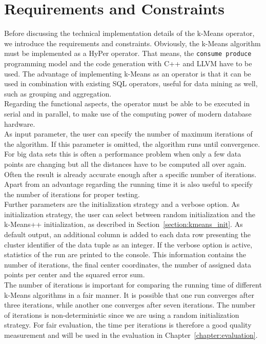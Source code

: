 \section{Requirements and Constraints}
Before discussing the technical implementation details of the k-Means operator, we introduce the requirements and constraints. Obviously, the k-Means algorithm must be implemented as a HyPer operator. That means, the \texttt{consume produce} programming model and the code generation with C++ and LLVM have to be used. The advantage of implementing k-Means as an operator is that it can be used in combination with existing SQL operators, useful for data mining as well, such as grouping and aggregation.
\\
Regarding the functional aspects, the operator must be able to be executed in serial and in parallel, to make use of the computing power of modern database hardware.
\\
As input parameter, the user can specify the number of maximum iterations of the algorithm. If this parameter is omitted, the algorithm runs until convergence. For big data sets this is often a performance problem when only a few data points are changing but all the distances have to be computed all over again. Often the result is already accurate enough after a specific number of iterations. Apart from an advantage regarding the running time it is also useful to specify the number of iterations for proper testing.
\\
Further parameters are the initialization strategy and a verbose option. As initialization strategy, the user can select between random initialization and the k-Means++ initialization, as described in Section~\ref{section:kmeans_init}. As default output, an additional column is added to each data row presenting the cluster identifier of the data tuple as an integer. If the verbose option is active, statistics of the run are printed to the console. This information contains the number of iterations, the final center coordinates, the number of assigned data points per center and the squared error sum. 
\\
The number of iterations is  important for comparing the running time of different k-Means algorithms in a fair manner. It is possible that one run converges after three iterations, while another one converges after seven iterations. The number of iterations is non-deterministic since we are using a random initialization strategy. For fair evaluation, the time per iterations is therefore a good quality measurement and will be used in the evaluation in Chapter~\ref{chapter:evaluation}.


